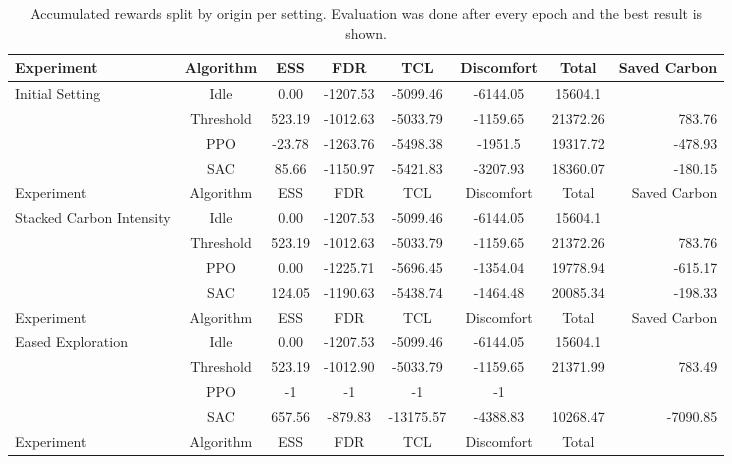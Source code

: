 \documentclass{article}
\begin{document}
\begin{table*}[t]
    \caption{Accumulated rewards split by origin per setting. Evaluation was done after every epoch and the best result is shown.}
    \label{tab:experiments}
    \vskip 0.15in
    \begin{center}
    \begin{small}
    \begin{sc}
    \begin{tabular}{lccccccr}
    \toprule
    Experiment & Algorithm & ESS & FDR & TCL & Discomfort & Total & Saved Carbon\\
    \midrule
    \multirow{4}{*}{Initial Setting} 
        & Idle      & 0.00   & -1207.53 & -5099.46  & -6144.05  & 15604.1 & \\
        & Threshold & 523.19 & -1012.63 & -5033.79 & -1159.65  & 21372.26 & 783.76\\
        & PPO       & -23.78   & -1263.76  & -5498.38 & -1951.5  & 19317.72 & -478.93 \\
        & SAC       & 85.66 & -1150.97 & -5421.83 & -3207.93  & 18360.07& -180.15\\
    \midrule
    Experiment & Algorithm & ESS & FDR & TCL & Discomfort & Total & Saved Carbon\\
    \midrule
    \multirow{4}{*}{Stacked Carbon Intensity}
        & Idle      & 0.00   & -1207.53 & -5099.46  & -6144.05  & 15604.1 & \\
        & Threshold & 523.19 & -1012.63 & -5033.79 & -1159.65  & 21372.26 & 783.76\\
        & PPO       & 0.00   & -1225.71 & -5696.45 &  -1354.04 & 19778.94 & -615.17\\
        & SAC       & 124.05 & -1190.63 & -5438.74 & -1464.48 & 20085.34 & -198.33\\
    \midrule
    Experiment & Algorithm & ESS & FDR & TCL & Discomfort & Total & Saved Carbon\\
    \midrule
    \multirow{4}{*}{Eased Exploration}
        & Idle      & 0.00   & -1207.53 & -5099.46  & -6144.05 & 15604.1 &\\
        & Threshold & 523.19 & -1012.90 & -5033.79 & -1159.65 & 21371.99 & 783.49\\
        & PPO       &  -1  & -1 & -1  & -1 & &\\
        & SAC       & 657.56 & -879.83 & -13175.57 & -4388.83 & 10268.47 &-7090.85\\
    \midrule
    Experiment & Algorithm & ESS & FDR & TCL & Discomfort & Total \\

\end{tabular}
\end{sc}
\end{small}
\end{center}
\end{table*}
\end{document}
